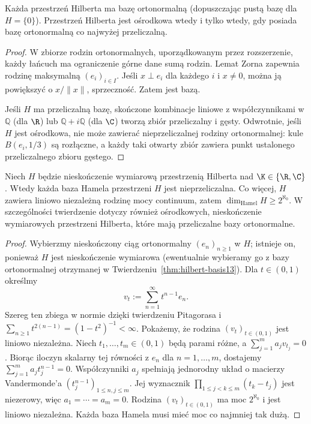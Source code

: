 \begin{twierdzenie}
\label{thm:hilbert-basis13}
Każda przestrzeń Hilberta ma bazę ortonormalną (dopuszczając pustą
bazę dla $H=\{0\}$). Przestrzeń Hilberta jest ośrodkowa wtedy i tylko
wtedy, gdy posiada bazę ortonormalną co najwyżej przeliczalną.
\end{twierdzenie}
\begin{proof}
W zbiorze rodzin ortonormalnych, uporządkowanym przez rozszerzenie,
każdy łańcuch ma ograniczenie górne dane sumą rodzin.
Lemat Zorna zapewnia rodzinę maksymalną $(e_i)_{i\in I}$.
Jeśli $x\perp e_i$ dla każdego $i$ i $x\ne0$, można ją powiększyć
o $x/\|x\|$, sprzeczność. Zatem jest bazą.

Jeśli $H$ ma przeliczalną bazę, skończone kombinacje liniowe z
współczynnikami w $\mathbb Q$ (dla $\R$) lub
$\mathbb Q+i\mathbb Q$ (dla $\C$) tworzą zbiór przeliczalny i gęsty.
Odwrotnie, jeśli $H$ jest ośrodkowa, nie może zawierać
nieprzeliczalnej rodziny ortonormalnej: kule
$B(e_i,1/3)$ są rozłączne, a każdy taki otwarty zbiór zawiera
punkt ustalonego przeliczalnego zbioru gęstego.
\end{proof}


\begin{twierdzenie}
\label{thm:hilbert-hamel-uncountable13}
Niech $H$ będzie nieskończenie wymiarową przestrzenią Hilberta
nad $\K\in\{\R,\C\}$. Wtedy każda baza Hamela przestrzeni $H$
jest nieprzeliczalna. Co więcej, $H$ zawiera liniowo niezależną
rodzinę mocy continuum, zatem
$\dim_{\mathrm{Hamel}}H\ge 2^{\aleph_0}$.
W szczególności twierdzenie dotyczy również ośrodkowych,
nieskończenie wymiarowych przestrzeni Hilberta, które mają
przeliczalne bazy ortonormalne.
\end{twierdzenie}
\begin{proof}
Wybierzmy nieskończony ciąg ortonormalny $(e_n)_{n\ge1}$
w $H$; istnieje on, ponieważ $H$ jest nieskończenie wymiarowa
(ewentualnie wybieramy go z bazy ortonormalnej otrzymanej
w Twierdzeniu~\ref{thm:hilbert-basis13}). Dla $t\in(0,1)$
określmy
\[
 v_t:=\sum_{n=1}^{\infty}t^{n-1}e_n.
\]
Szereg ten zbiega w normie dzięki twierdzeniu Pitagorasa i
$\sum_{n\ge1}t^{2(n-1)}=(1-t^2)^{-1}<\infty$.
Pokażemy, że rodzina $(v_t)_{t\in(0,1)}$ jest liniowo niezależna.
Niech $t_1,\ldots,t_m\in(0,1)$ będą parami różne, a
$\sum_{j=1}^m a_jv_{t_j}=0$. Biorąc iloczyn skalarny tej
równości z $e_n$ dla $n=1,\ldots,m$, dostajemy
$\sum_{j=1}^m a_jt_j^{n-1}=0$. Współczynniki $a_j$
spełniają jednorodny układ o macierzy Vandermonde'a
$(t_j^{n-1})_{1\le n,j\le m}$. Jej wyznacznik
$\prod_{1\le j<k\le m}(t_k-t_j)$ jest niezerowy, więc
$a_1=\cdots=a_m=0$. Rodzina $(v_t)_{t\in(0,1)}$ ma moc
$2^{\aleph_0}$ i jest liniowo niezależna. Każda baza Hamela
musi mieć moc co najmniej tak dużą.
\end{proof}

